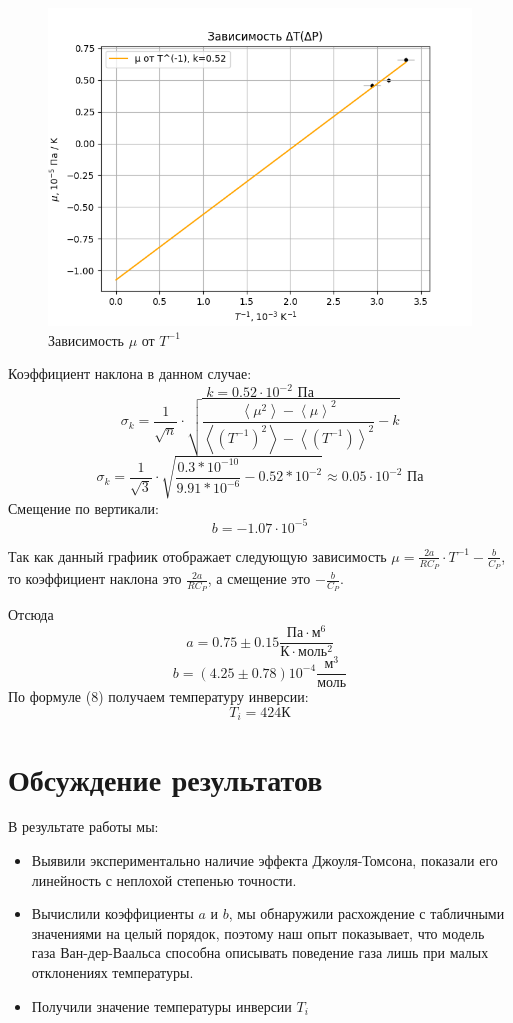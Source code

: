 \documentclass[a4paper, 10pt, twocolumn]{article}
\begin{document}
    \begin{figure}[H]
        \centering
        \includegraphics[width=1\linewidth]{graphs/figure2.png}
        \begin{center}
            \caption{Зависимость $\mu$ от $T^{-1}$ }
        \end{center}
    \end{figure}
    Коэффициент наклона в данном случае: $$ k = 0.52 \cdot 10^{-2} \text{ Па}$$
    $$\sigma_k = \frac{1}{\sqrt{n}} \cdot \sqrt{\frac{\left\langle \mu^2 \right\rangle - \left\langle \mu \right\rangle^2}
    {\left\langle \left({T^{-1}}\right)^2 \right\rangle - \left\langle \left({T^{-1}}\right) \right\rangle^2} - k }$$
    $$\sigma_k = \frac{1}{\sqrt{3}}\cdot \sqrt{\frac{0.3*10^{-10}}{9.91*10^{-6}} - 0.52*10^{-2}} \approx 0.05 \cdot 10^{-2} \text{ Па}$$
    Смещение по вертикали: $$ b = -1.07 \cdot 10^{-5}$$

    Так как данный графиик отображает следующую зависимость $ \mu = \frac{2a}{RC_P} \cdot T ^{-1} - \frac{b}{C_P}$, то коэффициент наклона это $\frac{2a}{RC_P}$, а смещение это $-\frac{b}{C_P}$.

    Отсюда $$ a = 0.75 \pm 0.15 \frac{\text{Па} \cdot \text{м}^6}{\text{К} \cdot \text{моль}^2} $$
    $$b = (4.25 \pm 0.78) 10^{-4} \frac{\text{м}^3}{\text{моль}}$$
    По формуле (8) получаем температуру инверсии: $$ T_i = 424 \text{К}$$

\section{Обсуждение результатов}
    В результате работы мы:
    \begin{itemize}
        \item Выявили экспериментально наличие эффекта Джоуля-Томсона,
        показали его линейность с неплохой степенью точности.

        \item Вычислили коэффициенты $a$ и $b$, мы обнаружили расхождение с табличными значениями на целый порядок, поэтому наш опыт показывает, что модель газа Ван-дер-Ваальса способна описывать поведение газа лишь при малых отклонениях температуры.

        \item Получили значение температуры инверсии $T_i$
    \end{itemize}
    \newpage
\onecolumn
\end{document}
